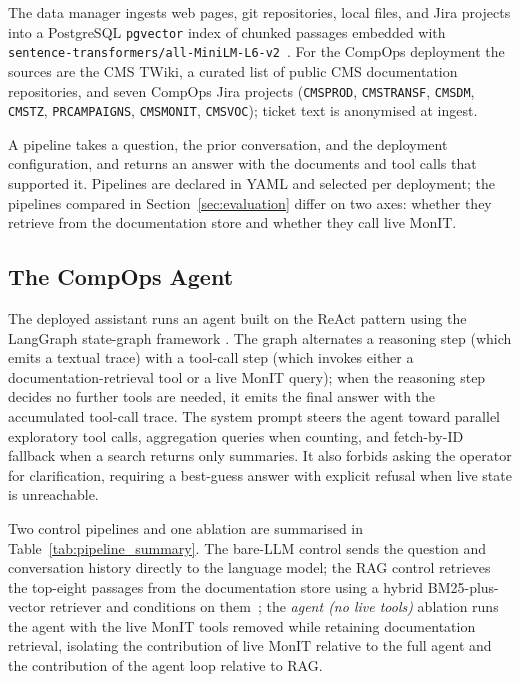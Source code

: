 The data manager ingests web pages, git repositories, local
files, and Jira projects into a PostgreSQL \texttt{pgvector}
index of chunked passages embedded with
\texttt{sentence-transformers/all-MiniLM-L6-v2}~\cite{reimers2019sbert}.
For the CompOps deployment the sources are the CMS TWiki, a
curated list of public CMS documentation repositories, and seven
CompOps Jira projects (\texttt{CMSPROD}, \texttt{CMSTRANSF},
\texttt{CMSDM}, \texttt{CMSTZ}, \texttt{PRCAMPAIGNS},
\texttt{CMSMONIT}, \texttt{CMSVOC}); ticket text is anonymised at
ingest.

A pipeline takes a question, the prior conversation, and the
deployment configuration, and returns an answer with the
documents and tool calls that supported it. Pipelines are
declared in YAML and selected per deployment; the pipelines
compared in Section~\ref{sec:evaluation} differ on two axes:
whether they retrieve from the documentation store and whether
they call live MonIT.

\subsection{The CompOps Agent}
\label{sec:pipelines}

The deployed assistant runs an agent built on the ReAct pattern
\cite{yao2023react} using the LangGraph state-graph framework
\cite{langgraph}.
The graph alternates a reasoning step (which emits a textual
trace) with a tool-call step (which invokes either a
documentation-retrieval tool or a live MonIT query); when the
reasoning step decides no further tools are needed, it emits the
final answer with the accumulated tool-call trace.
The system prompt steers the agent toward parallel exploratory
tool calls, aggregation queries when counting, and fetch-by-ID
fallback when a search returns only summaries. It also forbids
asking the operator for clarification, requiring a best-guess
answer with explicit refusal when live state is unreachable.

Two control pipelines and one ablation are summarised in
Table~\ref{tab:pipeline_summary}. The bare-LLM control sends the
question and conversation history directly to the language model;
the RAG control retrieves the top-eight passages from the
documentation store using a hybrid BM25-plus-vector retriever and
conditions on them~\cite{lewis2020rag}; the \emph{agent (no live
tools)} ablation runs the agent with the live MonIT tools removed
while retaining documentation retrieval, isolating the
contribution of live MonIT relative to the full agent and the
contribution of the agent loop relative to RAG.


